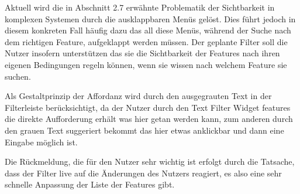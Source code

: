 Aktuell wird die in Abschnitt 2.7 erwähnte Problematik der Sichtbarkeit in komplexen Systemen durch die ausklappbaren Menüs gelöst.
Dies führt jedoch in diesem konkreten Fall häufig dazu das all diese Menüs, während der Suche nach dem richtigen Feature, aufgeklappt werden müssen.
Der geplante Filter soll die Nutzer insofern unterstützen das sie die Sichtbarkeit der Features nach ihren eigenen Bedingungen regeln können, wenn sie wissen nach welchem Feature sie suchen.

Als Gestaltprinzip der Affordanz wird durch den ausgegrauten Text in der Filterleiste berücksichtigt, da der Nutzer durch den Text \glqq Filter Widget features\grqq{} die direkte Aufforderung erhält was hier getan werden kann, zum anderen durch den grauen Text suggeriert bekommt das hier etwas anklickbar und dann eine Eingabe möglich ist.

Die Rückmeldung, die für den Nutzer sehr wichtig ist erfolgt durch die Tatsache, dass der Filter live auf die Änderungen des Nutzers reagiert, es also eine sehr schnelle Anpassung der Liste der Features gibt.


